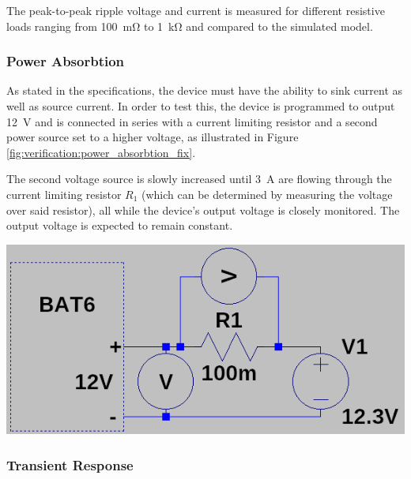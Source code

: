 The peak-to-peak ripple voltage  and current is measured for different resistive
loads ranging from \SI{100}{\milli\ohm} to \SI{1}{\kilo\ohm} and compared to the
simulated model.

\subsubsection{Power Absorbtion}

\begin{minipage}{0.5\textwidth}
    As  stated  in  the  specifications,  the device  must  have  the  ability
    to  sink   current  as  well  as   source  current.   In  order   to  test
    this,  the   device  is  programmed   to  output  \SI{12}{\volt}   and  is
    connected  in  series  with  a  current limiting  resistor  and  a  second
    power  source  set   to  a  higher  voltage,  as   illustrated  in  Figure
    \ref{fig:verification:power_absorbtion_fix}.

    The second  voltage source is  slowly increased until  \SI{3}{\ampere} are
    flowing  through  the  current  limiting  resistor  $R_1$  (which  can  be
    determined by  measuring the  voltage over said  resistor), all  while the
    device's  output  voltage  is  closely monitored. The  output  voltage  is
    expected to remain constant.
\end{minipage}
\begin{minipage}{0.5\textwidth}
    \centering
    \includegraphics[width=.9\textwidth]{images/sim/power-absorbtion-fixture.png}
    \label{fig:verification:power_absorbtion_fix}
\end{minipage}



\subsubsection{Transient Response}

